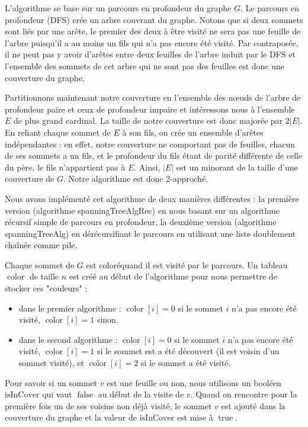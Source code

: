 \documentclass[a4paper,10pt]{article}
\DeclareMathOperator{\true}{true}
\DeclareMathOperator{\false}{false}
\DeclareMathOperator{\Color}{color}
\begin{document}
L'algorithme se base sur un parcours en profondeur du graphe $G$. Le parcours en profondeur (DFS) crée un arbre couvrant du graphe. Notons que si deux sommets sont liés par une arête, le premier des deux à être visité ne sera pas une feuille de l'arbre puisqu'il a au moins un fils qui n'a pas encore été visité. Par contraposée, il ne peut pas y avoir d'arêtes entre deux feuilles de l'arbre induit par le DFS et l'ensemble des sommets de cet arbre qui ne sont pas des feuilles est donc une couverture du graphe. 

Partitionnons maintenant notre couverture en l'ensemble des nœuds de l'arbre de profondeur paire et ceux de profondeur impaire et intéressons nous à l'ensemble $E$ de plus grand cardinal. La taille de notre couverture est donc majorée par $2|E|$. En reliant chaque sommet de $E$ à son fils, on crée un ensemble d'arêtes indépendantes : en effet, notre couverture ne comportant pas de feuilles, chacun de ses sommets a un fils, et le profondeur du fils étant de parité différente de celle du père, le fils n'appartient pas à $E$. Ainsi, $|E|$ est un minorant de la taille d'une couverture de $G$. Notre algorithme est donc 2-approché.


Nous avons implémenté cet algorithme de deux manières différentes : la première version (algorithme \og spanningTreeAlgRec\fg) en nous basant sur un algorithme récursif simple de parcours en profondeur, la deuxième version (algorithme \og spanningTreeAlg\fg) en dérécursifiant le parcours en utilisant une liste doublement chaînée comme pile.

Chaque sommet de $G$ est \og coloré\fg quand il est visité par le parcours. Un tableau $\Color$ de taille $n$ est créé au début de l'algorithme pour nous permettre de stocker ces "couleurs" : 

\begin{itemize}
\item dans le premier algorithme : $\Color[i] = 0$ si le sommet $i$ n'a pas encore été visité, $\Color[i] = 1$ sinon.
\item dans le second algorithme : $\Color[i] = 0$ si le sommet $i$ n'a pas encore été visité, $\Color[i] = 1$ si le sommet est a été découvert (il est voisin d'un sommet visité), et $\Color[i] = 2$ si le sommet a été visité.
\end{itemize}



Pour savoir si un sommet $v$ est une feuille ou non, nous utilisons un booléen $\mathrm{isInCover}$ qui vaut $\false$ au début de la visite de $v$. Quand on rencontre pour la première fois un de ses voisins non déjà visité, le sommet $v$ est ajouté dans la couverture du graphe et la valeur de $\mathrm{isInCover}$ est mise à $\true$.
\end{document}
